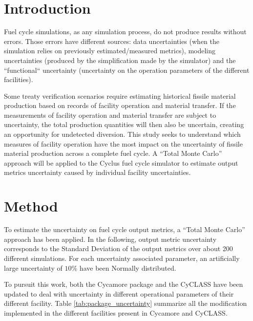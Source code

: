 \documentclass{anstrans}
\title{}
\author{Baptiste Mouginot,$^{*}$ Kathryn Mummah,$^{*}$ Paul P.H. Wilson$^{*}$}
\institute{
$^{*}$University of Wisconsin-Madison, WI
}
\begin{document}
\section{Introduction}

Fuel cycle simulations, as any simulation process, do not produce results
without errors. Those errors have different sources: data uncertainties (when
the simulation relies on previously estimated/measured metrics), modeling
uncertainties (produced by the simplification made by the simulator) and the
``functional`` uncertainty (uncertainty on the operation parameters of the
different facilities).

Some treaty verification scenarios require estimating historical fissile
material production based on records of facility operation and material
transfer.  If the measurements of facility operation and material transfer are
subject to uncertainty, the total production quantities will then also be
uncertain, creating an opportunity for undetected diversion.  This study seeks
to understand which measures of facility operation have the most impact on the
uncertainty of fissile material production across a complete fuel cycle.  A
``Total Monte Carlo'' approach will be applied to the Cyclus fuel cycle simulator
\cite{cyclus} to estimate output metrics uncertainty caused by individual
facility uncertainties.

\section{Method}

To estimate the uncertainty on fuel cycle output metrics, a ``Total Monte
Carlo'' approach has been applied. In the following, output metric uncertainty
corresponds to the Standard Deviation of the output metrics over about 200
different simulations. For each uncertainty associated parameter, an
artificially large uncertainty of $10\%$ have been Normally distributed.

To pursuit this work, both the Cycamore\cite{cycamore} package and the
CyCLASS\cite{cyclass} have been updated to deal with uncertainty in different
operational parameters of their different facility.  Table
\ref{tab:package_uncertainty} summarize all the modification implemented in the
different facilities present in Cycamore and CyCLASS.
\end{document}
